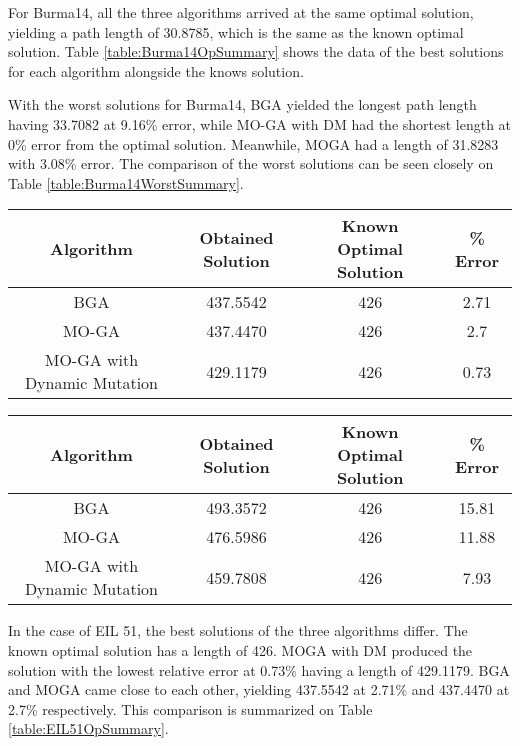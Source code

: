 For Burma14, all the three algorithms arrived at the same optimal solution, yielding a path length of 30.8785, which is the same as the known optimal solution. Table \ref{table:Burma14OpSummary} shows the data of the best solutions for each algorithm alongside the knows solution.

With the worst solutions for Burma14, BGA yielded the longest path length having 33.7082 at 9.16\% error, while MO-GA with DM had the shortest length at 0\% error from the optimal solution. Meanwhile, MOGA had a length of 31.8283 with 3.08\% error. The comparison of the worst solutions can be seen closely on Table \ref{table:Burma14WorstSummary}.


\begin{table*}[h]
	\begin{center}
		\begin{tabular}{ c c c c }
			Algorithm& Obtained Solution & Known Optimal Solution&\% Error\\ 
			\hline
			BGA & 437.5542 &426& 2.71 \\
			MO-GA & 437.4470 &426& 2.7  \\
			MO-GA with Dynamic Mutation & 429.1179 &426& 0.73 \\
		\end{tabular}
		\caption{The comparison of the obtained best optimum solutions for EIL51 after 100 runs.}
		\label{table:EIL51OpSummary}
	\end{center}
\end{table*}

\begin{table*}[h]
	\begin{center}
		\begin{tabular}{ c c c c }
			Algorithm& Obtained Solution & Known Optimal Solution&\% Error\\ 
			\hline
			BGA & 493.3572 & 426&15.81 \\
			MO-GA & 476.5986 & 426&11.88  \\
			MO-GA with Dynamic Mutation & 459.7808 &426 & 7.93 \\
		\end{tabular}
		\caption{The comparison of the obtained worst optimum solutions for EIL51 after 100 runs.}
		\label{table:EIL51WorstSummary}
	\end{center}
\end{table*}

In the case of EIL 51, the best solutions of the three algorithms differ. The known optimal solution has a length of 426.  MOGA with DM produced the solution with the lowest relative error at 0.73\% having a length of 429.1179. BGA and MOGA came close to each other, yielding 437.5542 at 2.71\% and 437.4470 at 2.7\% respectively. This comparison is summarized on Table \ref{table:EIL51OpSummary}.

